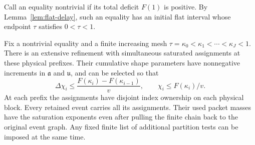 Call an equality nontrivial if its total deficit $F(1)$ is positive.
By Lemma~\ref{lem:flat-delay}, such an equality has an initial flat
interval whose endpoint $\tau$ satisfies $0<\tau<1$.

\begin{lemma}
\label{lem:nested-cuts}
Fix a nontrivial equality and a finite increasing mesh
$\tau=\kappa_0<\kappa_1<\cdots<\kappa_J<1$. There is an extensive
refinement with simultaneous saturated assignments at these physical
prefixes. Their cumulative shape parameters have nonnegative increments
in $\mathfrak a$ and $\mathfrak u$, and can be selected so that
\begin{equation}
 \Delta\chi_i\le
 \frac{F(\kappa_i)-F(\kappa_{i-1})}{v},
 \qquad
 \chi_i\le F(\kappa_i)/v.
 \label{eq:chain-shape-bound}
\end{equation}
At each prefix the assignments have disjoint index ownership on each
physical block. Every retained event carries all its assignments. Their
used packet masses have the saturation exponents even after pulling the
finite chain back to the original event graph. Any fixed finite list of
additional partition tests can be imposed at the same time.
\end{lemma}

